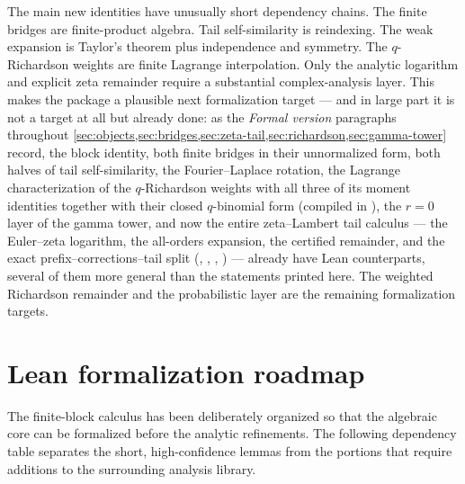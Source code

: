 \documentclass[11pt,oneside]{article}
\numberwithin{equation}{section}
\theoremstyle{definition}
\theoremstyle{remark}
\begin{document}
The main new identities have unusually short dependency chains.  The finite bridges are
finite-product algebra.  Tail self-similarity is reindexing.  The weak expansion is Taylor's
theorem plus independence and symmetry.  The $q$-Richardson weights are finite Lagrange
interpolation.  Only the analytic logarithm and explicit zeta remainder require a substantial
complex-analysis layer.  This makes the package a plausible next formalization target --- and
in large part it is not a target at all but already done: as the \emph{Formal version}
paragraphs throughout \cref{sec:objects,sec:bridges,sec:zeta-tail,sec:richardson,sec:gamma-tower}
record, the block identity, both finite bridges in their unnormalized form, both halves of
tail self-similarity, the Fourier--Laplace rotation, the Lagrange characterization of the
$q$-Richardson weights with all three of its moment identities together with their closed
$q$-binomial form (compiled in ), the $r=0$ layer
of the gamma tower, and now the entire zeta--Lambert tail calculus --- the Euler--zeta
logarithm, the all-orders expansion, the certified remainder, and the exact
prefix--corrections--tail split (, ,
, ) --- already have Lean
counterparts, several of them more general than the statements printed here.  The weighted
Richardson remainder and the probabilistic layer are the remaining formalization targets.

\section{Lean formalization roadmap}
\label{sec:formalization}

The finite-block calculus has been deliberately organized so that the algebraic core can be
formalized before the analytic refinements.  The following dependency table separates the
short, high-confidence lemmas from the portions that require additions to the surrounding
analysis library.
\end{document}
